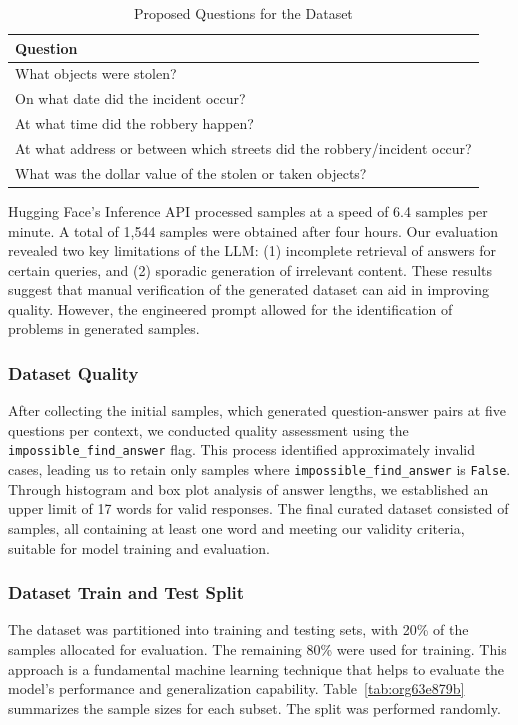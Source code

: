 \documentclass[runningheads]{llncs}
\begin{document}
\begin{table}[h]
  \centering
  \scriptsize
\caption{Proposed Questions for the Dataset}
\label{tab:commonquestions}
\begin{tabular}{|p{}|}
\hline
\textbf{Question} \\
\hline
What objects were stolen? \\
On what date did the incident occur? \\
At what time did the robbery happen? \\
At what address or between which streets did the robbery/incident occur? \\
What was the dollar value of the stolen or taken objects? \\
\hline
\end{tabular}
\end{table}

Hugging Face's Inference API processed samples at a speed of 6.4
samples per minute. A total of 1,544 samples were obtained after four
hours. Our evaluation revealed two key limitations of the LLM: (1)
incomplete retrieval of answers for certain queries, and (2) sporadic
generation of irrelevant content. These results suggest that manual
verification of the generated dataset can aid in improving
quality. However, the engineered prompt allowed for the identification
of problems in generated samples.
\subsubsection{Dataset Quality}
\label{sec:dataset-quality}
After collecting the initial  samples, which generated
 question-answer pairs at five questions per context,
we conducted quality assessment using the
\texttt{impossible\_find\_answer} flag. This process identified
approximately  invalid cases, leading us to retain only
samples where \texttt{impossible\_find\_answer} is
\texttt{False}. Through histogram and box plot analysis of answer
lengths, we established an upper limit of 17 words for valid
responses. The final curated dataset consisted of 
samples, all containing at least one word and meeting our validity
criteria, suitable for model training and evaluation.


\subsubsection{Dataset Train and Test Split}
\label{sec:dataset-split}
The dataset was partitioned into training and testing sets, with 20\%
of the samples allocated for evaluation. The remaining 80\% were used
for training. This approach is a fundamental machine learning
technique that helps to evaluate the model's performance and
generalization capability. Table~\ref{tab:org63e879b} summarizes the
sample sizes for each subset. The split was performed randomly.
\end{document}
